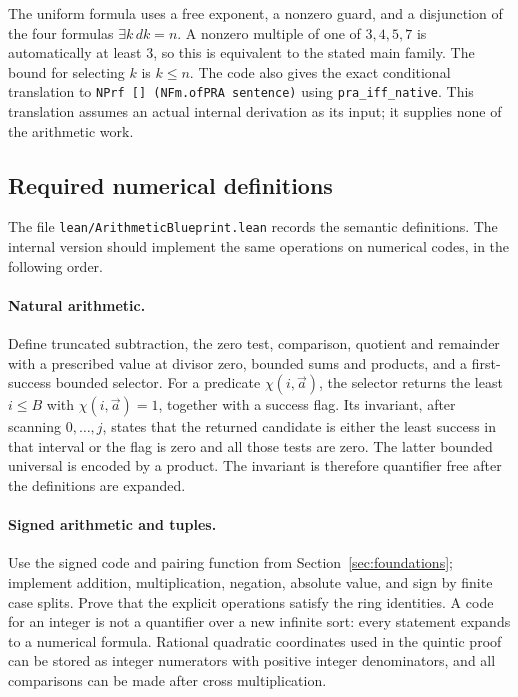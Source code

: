 The uniform formula uses a free exponent, a nonzero guard, and a
disjunction of the four formulas $\exists k\,dk=n$. A nonzero multiple of
one of $3,4,5,7$ is automatically at least $3$, so this is equivalent to
the stated main family. The bound for selecting $k$ is $k\leq n$.
The code also gives the exact conditional translation to
\texttt{NPrf [] (NFm.ofPRA sentence)} using
\texttt{pra\_iff\_native}. This translation assumes an actual internal
derivation as its input; it supplies none of the arithmetic work.

\subsection{Required numerical definitions}

The file \texttt{lean/ArithmeticBlueprint.lean} records the semantic
definitions. The internal version should implement the same operations
on numerical codes, in the following order.

\paragraph{Natural arithmetic.}
Define truncated subtraction, the zero test, comparison, quotient and
remainder with a prescribed value at divisor zero, bounded sums and
products, and a first-success bounded selector. For a predicate
$\chi(i,\vec a)$, the selector returns the least $i\leq B$ with
$\chi(i,\vec a)=1$, together with a success flag. Its invariant, after
scanning $0,\ldots,j$, states that the returned candidate is either the
least success in that interval or the flag is zero and all those tests
are zero. The latter bounded universal is encoded by a product. The
invariant is therefore quantifier free after the definitions are expanded.

\paragraph{Signed arithmetic and tuples.}
Use the signed code and pairing function from
Section~\ref{sec:foundations}; implement addition, multiplication, negation,
absolute value, and sign by finite case splits. Prove that the explicit
operations satisfy the ring identities. A code for an integer is not a
quantifier over a new infinite sort: every statement expands to a numerical
formula. Rational quadratic coordinates used in the quintic proof can be
stored as integer numerators with positive integer denominators, and all
comparisons can be made after cross multiplication.

